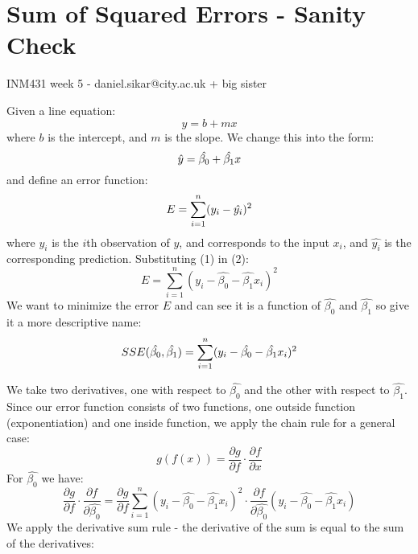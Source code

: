 \documentclass{article}
\begin{document}
\section*{Sum of Squared Errors - Sanity Check}
INM431 week 5 - daniel.sikar@city.ac.uk + big sister

Given a line equation:
$$y = b + mx$$
where $b$ is the intercept, and $m$ is the slope.
We change this into the form:
\begin{equation}
\hat{y} = \hat{\beta_{0}} + \hat{\beta_{1}}x  \\ \label{eq:1}
\end{equation}
and define an error function:
\begin{equation}
E = \sum_{i=1}^{n} (y_i - \hat{y_i})^2  \\ \label{eq:2}
\end{equation}
where $y_i$ is the $i$th observation of $y$, and corresponds to the input $x_i$, and $\hat{y_i}$ is the corresponding prediction. 
Substituting (1) in (2):
$$
E = \sum_{i=1}^{n} (y_i - \hat{\beta_{0}} - \hat{\beta_{1}}x_i)^2 
$$
We want to minimize the error $E$ and can see it is a function of $\hat{\beta_0}$ and $\hat{\beta_1}$ so give it a more descriptive name:
\begin{equation}
SSE(\hat{\beta_0},\hat{\beta_1}) = \sum_{i=1}^{n} (y_i - \hat{\beta_{0}} - \hat{\beta_{1}}x_i)^2 \\ \label{eq:3}
\end{equation}

We take two derivatives, one with respect to $\hat{\beta_0}$ and the other with respect to $\hat{\beta_1}$. Since our error function consists of two functions, one outside function (exponentiation) and one inside function, we apply the chain rule for a general case:
$$
g(f(x)) = \frac{\partial g}{\partial f}\cdot\frac{\partial f}{\partial x}
$$
For $\hat{\beta_0}$ we have:
$$
\frac{\partial g}{\partial f}\cdot\frac{\partial f} {\partial \hat{\beta_0}} = 
\frac{\partial g}{\partial f} \sum_{i=1}^{n} (y_i - \hat{\beta_{0}} - \hat{\beta_{1}}x_i)^2 \cdot \frac{\partial f} {\partial \hat{\beta_0}} (y_i - \hat{\beta_{0}} - \hat{\beta_{1}}x_i)
$$
We apply the derivative sum rule - the derivative of the sum is equal to the sum of the derivatives:

\end{document}
